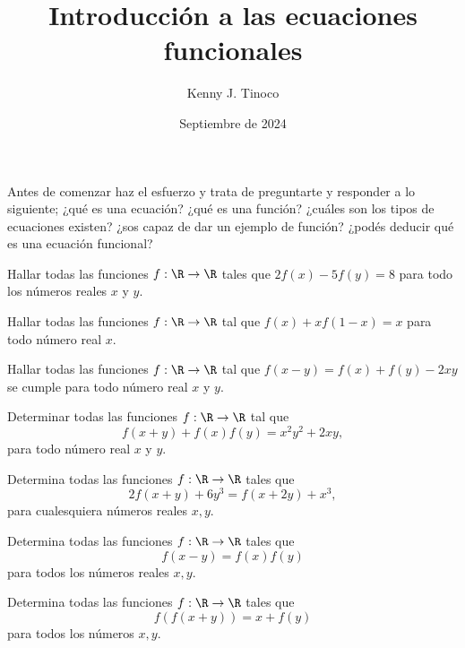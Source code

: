 \documentclass[12pt]{article}
\title{Introducción a las ecuaciones funcionales}
\author{Kenny J. Tinoco}
\date{Septiembre de 2024}
\begin{document}
   \maketitle
   Antes de comenzar haz el esfuerzo y trata de preguntarte y responder a lo siguiente;
   ¿qué es una ecuación?
   ¿qué es una función?
   ¿cuáles son los tipos de ecuaciones existen?
   ¿sos capaz de dar un ejemplo de función?
   ¿podés deducir qué es una ecuación funcional?

   \begin{exercise}
      Hallar todas las funciones $f : \R \to \R$ tales que $2f(x) - 5f(y) = 8$ para todo los números reales $x$ y $y$.
   \end{exercise}

   \begin{exercise}
      Hallar todas las funciones $f : \R \to \R$ tal que $f(x) + xf(1 - x) = x$ para todo número real $x$.
   \end{exercise}

   \begin{exercise}
      Hallar todas las funciones $f : \R \to \R$ tal que $f(x - y) = f(x) + f(y) - 2xy$ se cumple para todo número real $x$ y $y$.
   \end{exercise}

   \begin{exercise}
      Determinar todas las funciones $f : \R \to \R$ tal que
      \[
         f(x + y) + f(x)f(y) = x^2 y^2 + 2xy,
      \]
      para todo número real $x$ y $y$.
   \end{exercise}

   \begin{exercise}
      Determina todas las funciones $f : \R \to \R$ tales que
      \[
         2f(x + y) + 6y^3 = f(x + 2y) + x^3,
      \]
      para cualesquiera números reales $x,y$.
   \end{exercise}

   \begin{exercise}
      Determina todas las funciones $f : \R \to \R$ tales que
      \[
         f(x - y) = f(x)f(y)
      \]
      para todos los números reales $x,y$.
   \end{exercise}

   \begin{exercise}
      Determina todas las funciones $f : \R \to \R$ tales que
      \[
         f(f(x + y)) = x + f(y)
      \]
      para todos los números $x,y$.
   \end{exercise}
\end{document}
